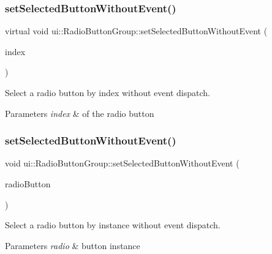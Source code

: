 \subsubsection{\texorpdfstring{set\+Selected\+Button\+Without\+Event()}{setSelectedButtonWithoutEvent()}\hspace{0.1cm}{\footnotesize\ttfamily [2/4]}}
{\footnotesize\ttfamily virtual void ui\+::\+Radio\+Button\+Group\+::set\+Selected\+Button\+Without\+Event (\begin{DoxyParamCaption}\item[{int}]{index }\end{DoxyParamCaption})\hspace{0.3cm}{\ttfamily [virtual]}}

Select a radio button by index without event dispatch.


\begin{DoxyParams}{Parameters}
{\em index} & of the radio button \\
\hline
\end{DoxyParams}
\mbox{\label{classui_1_1RadioButtonGroup_a5232389d8cddeecbb36ae054a86a656f}} 
\subsubsection{\texorpdfstring{set\+Selected\+Button\+Without\+Event()}{setSelectedButtonWithoutEvent()}\hspace{0.1cm}{\footnotesize\ttfamily [3/4]}}
{\footnotesize\ttfamily void ui\+::\+Radio\+Button\+Group\+::set\+Selected\+Button\+Without\+Event (\begin{DoxyParamCaption}\item[{\hyperlink{classui_1_1RadioButton}{Radio\+Button} $\ast$}]{radio\+Button }\end{DoxyParamCaption})\hspace{0.3cm}{\ttfamily [virtual]}}

Select a radio button by instance without event dispatch.


\begin{DoxyParams}{Parameters}
{\em radio} & button instance \\
\hline
\end{DoxyParams}
\mbox{\label{classui_1_1RadioButtonGroup_aa9f825f30344b0abb0b7133bf90a3dcb}} 
